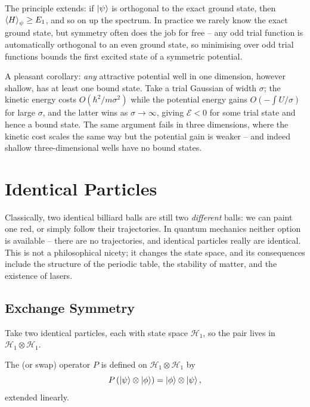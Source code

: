 \documentclass[a4paper]{scrartcl}
\begin{document}
\begin{remark}
    The principle extends: if $\ket{\psi}$ is orthogonal to the exact ground state, then $\expval{H}_\psi \geq E_1$, and so on up the spectrum. In practice we rarely know the exact ground state, but symmetry often does the job for free -- any odd trial function is automatically orthogonal to an even ground state, so minimising over odd trial functions bounds the first excited state of a symmetric potential.
\end{remark}

\begin{remark}
    A pleasant corollary: \emph{any} attractive potential well in one dimension, however shallow, has at least one bound state. Take a trial Gaussian of width $\sigma$; the kinetic energy costs $O(\hbar^2/m\sigma^2)$ while the potential energy gains $O(-\int U/\sigma)$ for large $\sigma$, and the latter wins as $\sigma\to\infty$, giving $\mathcal{E} < 0$ for some trial state and hence a bound state. The same argument fails in three dimensions, where the kinetic cost scales the same way but the potential gain is weaker -- and indeed shallow three-dimensional wells have no bound states.
\end{remark}

\section{Identical Particles}

Classically, two identical billiard balls are still two \emph{different} balls: we can paint one red, or simply follow their trajectories. In quantum mechanics neither option is available -- there are no trajectories, and identical particles really are identical. This is not a philosophical nicety; it changes the state space, and its consequences include the structure of the periodic table, the stability of matter, and the existence of lasers.

\subsection{Exchange Symmetry}

Take two identical particles, each with state space $\mathcal{H}_1$, so the pair lives in $\mathcal{H}_1\otimes\mathcal{H}_1$.

\begin{definition}
    The  (or swap) operator $P$ is defined on $\mathcal{H}_1 \otimes \mathcal{H}_1$ by
    $$
    P\left( \ket\psi \otimes \ket\phi \right) = \ket\phi\otimes\ket\psi,
    $$
    extended linearly.
\end{definition}
\end{document}
